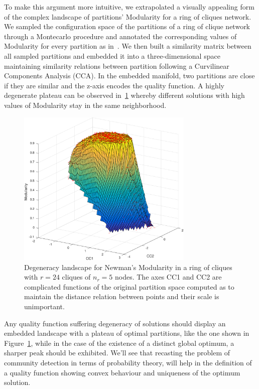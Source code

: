 To make this argument more intuitive, we extrapolated a visually appealing form of the complex landscape of partitions' Modularity for a ring of cliques network. We sampled the configuration space of the partitions of a ring of clique network through a Montecarlo procedure and annotated the corresponding values of Modularity for every partition as in~\cite{good2009}.
We then built a similarity matrix between all sampled partitions and embedded it into a three-dimensional space maintaining similarity relations between partition following a Curvilinear Components Analysis (CCA).
In the embedded manifold, two partitions are close if they are similar and the z-axis encodes the quality function.
A highly degenerate plateau can be observed in~\ref{fig:degeneracylandscape} whereby different solutions with high values of Modularity stay in the same neighborhood.

\begin{figure}[htb!]
\centering
\includegraphics[width=0.75\textwidth]{images/degeneracy_modularity.pdf}
\caption{Degeneracy landscape for Newman's Modularity in a ring of cliques with $r=24$ cliques of $n_r=5$ nodes. The axes CC1 and CC2 are complicated functions of the original partition space computed as to maintain the distance relation between points and their scale is unimportant.}
\label{fig:degeneracylandscape}
\end{figure}

Any quality function suffering degeneracy of solutions should display an embedded landscape with a plateau of optimal partitions, like the one shown in Figure~\ref{fig:degeneracylandscape}, while in the case of the existence of a distinct global optimum, a sharper peak should be exhibited.
We'll see that recasting the problem of community detection in terms of probability theory, will help in the definition of a quality function showing convex behaviour and uniqueness of the optimum solution.

